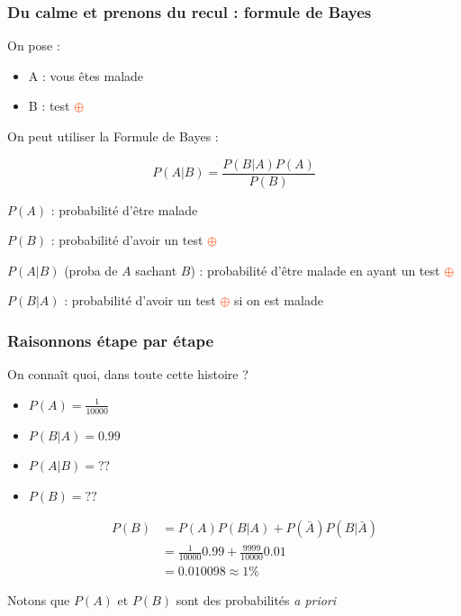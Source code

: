 \documentclass[usenames, dvipsnames]{beamer}
\newcommand{\positif}{\textcolor{OrangeRed}{$\oplus$} }
\begin{document}
\begin{frame}[plain]
\frametitle{Du calme et prenons du recul : formule de Bayes}

\pause

On pose :

\begin{itemize}
\item A : vous êtes malade
\item B : test \positif
\end{itemize}

\pause

On peut utiliser la \alert{Formule de Bayes} :

\[
P(A|B) = \frac{P(B|A)P(A)}{P(B)}
\]

\pause
$P(A)$ : probabilité d'être malade

$P(B)$ : probabilité d'avoir un test \positif\pause

$P(A|B)$ (proba de $A$ sachant $B$) : probabilité d'être malade en ayant un test \positif\pause

$P(B|A)$ : probabilité d'avoir un test \positif si on est malade %

\end{frame}

\begin{frame}[plain]
\frametitle{Raisonnons étape par étape}

On connaît quoi, dans toute cette histoire ?

\begin{itemize}
\item $P(A) = \frac{1}{10000}$ \pause
\item $P(B|A) = 0.99$ \pause
\item $P(A|B) = ??$ \pause
\item $P(B) = ??$ \pause

\begin{align*}P(B) &= P(A)P(B|A) + P(\bar{A})P(B|\bar{A})\\
&=\frac{1}{10000}0.99 + \frac{9999}{10000}0.01\\
&= 0.010098 \approx 1\%\end{align*}

\end{itemize}

Notons que $P(A)$ et $P(B)$ sont des probabilités \textit{a priori}

\end{frame}
\end{document}
